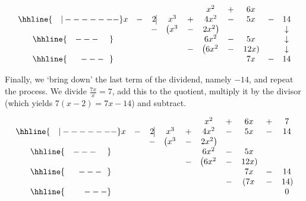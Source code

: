 \documentclass{ximera}
\begin{document}
\begin{exampleSol}
\begin{enumerate}
            \[ 
            \begin{array}{cccccccccc}
                & & & & & x^2 & + & 6x &  &  \\ \hhline{~~~|-------}
                x & - & 2  \vline& x^3 & + & 4x^2 & - & 5x & - & 14 \\
                &  &  -& \left(x^3 \right. & - & \left.  2x^2\right) &  & &  & \downarrow  \\ \hhline{~~~---~~~~} 
                &  &  &   &  & 6 x^2 & - & 5x &  &  \downarrow \\ 
                &  &  &   & - & \left(6 x^2 \right. & - & \left. 12x \right) &  & \downarrow \\ \hhline{~~~~~---~~} 
                &  &  &   &   &  & & 7x  & - & 14 \\
            \end{array}
            \]
            
            \setlength\arraycolsep{5pt}
            \setlength\extrarowheight{0pt}
            
            Finally, we `bring down' the last term of the dividend, namely $-14$, and repeat the process.  We divide $\frac{7x}{x} = 7$, add this to the quotient, multiply it by the divisor (which yields $7(x - 2) = 7x - 14$) and subtract.\setlength\arraycolsep{0.1pt}\setlength\extrarowheight{2pt}
            
            \[ 
            \begin{array}{cccccccccc}
                & & & & & x^2 & + & 6x & + & 7 \\ \hhline{~~~|-------}
                x & - & 2  \vline& x^3 & + & 4x^2 & - & 5x & - & 14 \\
                &  &  -& \left(x^3 \right. & - & \left.  2x^2\right) &  &  &  &  \\ \hhline{~~~---~~~~} 
                &  &  &   &  & 6 x^2 & - & 5x &  &  \\ 
                &  &  &   & - & \left(6 x^2 \right. & - & \left. 12x \right) &  &  \\ \hhline{~~~~~---~~} 
                &  &  &   &   &  & & 7x  & - & 14 \\
                &  &  &   &   &  & - & \left( 7x \right. & - & \left. 14 \right) \\ \hhline{~~~~~~~---} 
                &   &  &  &  &  &  &  &  & 0
            \end{array}
            \]
            \setlength\arraycolsep{5pt}
            \setlength\extrarowheight{0pt}
            

\end{enumerate}
\end{exampleSol}
\end{document}
